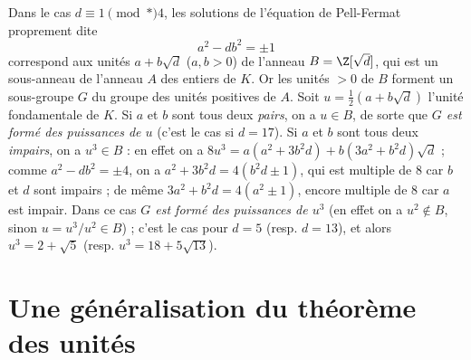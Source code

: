 \documentclass[11pt, useosf,
  title in boldface,
  theorem in new line,
  theorem numbering = section,
  number theorems separately,
]{simplivre}
\begin{document}
\begin{enumerate}
        \begin{remark}
            Dans le cas \( d \equiv 1 \pmod*{4} \), les solutions de l'équation de Pell-Fermat proprement dite
            \[
                a^2 - db^2 = \pm 1
            \]
            correspond aux unités \( a+b\sqrt{d} \) (\( a,b > 0 \)) de l'anneau \( B = \Z[\sqrt{d}] \), qui est un sous-anneau de l'anneau \( A \) des entiers de \( K \). Or les unités \( > 0 \) de \( B \) forment un sous-groupe \( G \) du groupe des unités positives de \( A \). Soit \( u = \frac{1}{2}(a+b\sqrt{d}) \) l'unité fondamentale de \( K \). Si \( a \) et \( b \) sont tous deux \emph{pairs}, on a \( u \in B \), de sorte que \emph{\( G \) est formé des puissances de \( u \)} (c'est le cas si \( d = 17 \)). Si \( a \) et \( b \) sont tous deux \emph{impairs}, on a \( u^3 \in B \) : en effet on a \( 8u^3 = a(a^2+3b^2 d)+b(3a^2+b^2 d)\sqrt{d} \) ; comme \( a^2-db^2 = \pm 4 \), on a \( a^2+3b^2 d = 4(b^2 d \pm 1) \), qui est multiple de \( 8 \) car \( b \) et \( d \) sont impairs ; de même \( 3a^2+b^2 d = 4(a^2 \pm 1) \), encore multiple de \( 8 \) car \( a \) est impair. Dans ce cas \emph{\( G \) est formé des puissances de \( u^3 \)} (en effet on a \( u^2 \notin B \), sinon \( u = u^3/u^2 \in B \)) ; c'est le cas pour \( d = 5 \) (resp. \( d = 13 \)), et alors \( u^3 = 2+\sqrt{5} \) (resp. \( u^3 = 18+5\sqrt{13} \)).
        \end{remark}
    \end{enumerate}

\section{Une généralisation du théorème des unités}\label{sec:une généralisation du théorème des unités}
\end{document}
